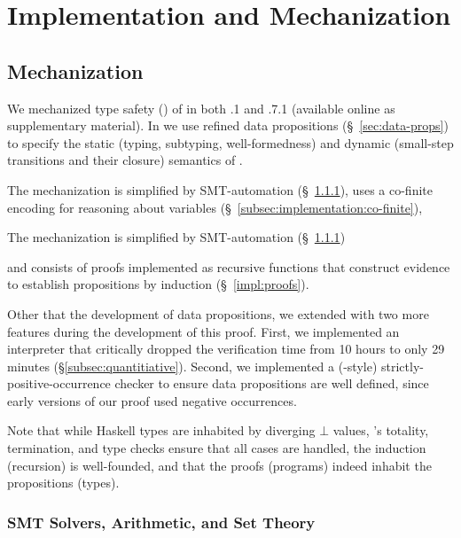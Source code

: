\chapter{Implementation and Mechanization}
\label{ch:implementation}

\section{\lh Mechanization}

We mechanized type safety () 
of \sysrf in both .1 and .7.1
(available online as supplementary
material).
%
In \lh we use refined data propositions 
(\S~\ref{sec:data-props}) to specify the
static (\eg typing, subtyping, well-formedness)
and dynamic (\ie small-step transitions and their closure)
semantics of \sysrf.
%
\begin{fullversion}
  The \lh mechanization is simplified by 
  SMT-automation (\S~\ref{impl:settheory}),
  uses a co-finite encoding for reasoning about
  variables (\S~\ref{subsec:implementation:co-finite}),
\end{fullversion}
\begin{conference}
  The \lh mechanization is simplified by 
  SMT-automation (\S~\ref{impl:settheory})
\end{conference}
and consists of proofs implemented as recursive functions that
construct  evidence to establish propositions by
induction (\S~\ref{impl:proofs}).
%


  Other that the development of data propositions, we extended \lh 
  with two more features during the development of this proof. 
  First, we implemented an interpreter that 
  critically dropped the verification time from 10 hours 
  to only 29 minutes (\S\ref{subsec:quantitiative}). 
  Second, we implemented a (\coq-style) strictly-positive-occurrence checker
  to ensure data propositions are well defined, 
  since early versions of our proof used negative occurrences. 

%
Note that while Haskell types are inhabited
by diverging $\bot$ values, \lh's totality,
termination, and type checks ensure that all
cases are handled, the induction (recursion)
is well-founded, and that the proofs (programs)
indeed inhabit the propositions (types).


\subsection{SMT Solvers, Arithmetic, and Set Theory} \label{impl:settheory}

